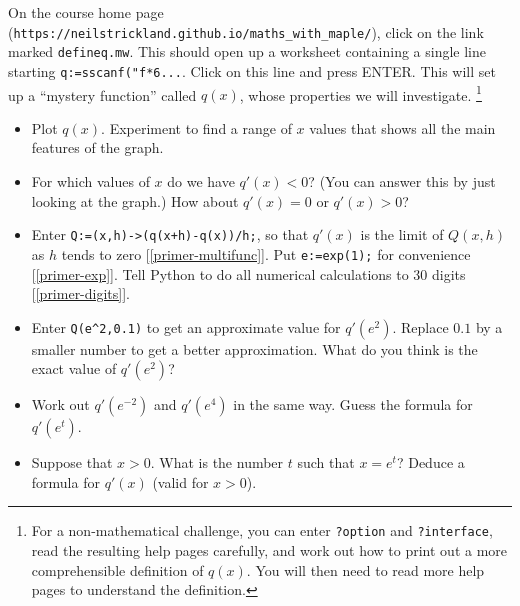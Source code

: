 \documentclass[a4paper,10pt]{amsbook}
\begin{document}
\begin{exercise}\label{ex-Li}
 On the course home page
 (\verb~https://neilstrickland.github.io/maths_with_maple/~), click on
 the link marked \verb~defineq.mw~.  This should open up a worksheet 
 containing a single line starting
 \verb~q:=sscanf("f*6...~.  Click on this line and press
 ENTER.  This will set up a ``mystery function'' called
 $q(x)$, whose properties we will investigate. 
 \footnote{For a non-mathematical challenge, you can enter
  \verb~?option~ and \verb~?interface~, read the resulting help pages
  carefully, and work out how to print out a more
  comprehensible definition of $q(x)$.  You will then need
  to read more help pages to understand the definition. 
 }
 \begin{itemize}
  \item[(a)] Plot $q(x)$.  Experiment to find a range of $x$ values
   that shows all the main features of the graph. 
  \item[(b)] For which values of $x$ do we have $q'(x)<0$?  (You can
   answer this by just looking at the graph.)  How about $q'(x)=0$ or
   $q'(x)>0$? 
  \item[(c)] Enter \verb~Q:=(x,h)->(q(x+h)-q(x))/h;~, so that $q'(x)$
   is the limit of $Q(x,h)$ as $h$ tends to zero
   [\ref{primer-multifunc}].  Put \verb~e:=exp(1);~ for
   convenience [\ref{primer-exp}].  Tell Python to do all numerical
   calculations to 30 digits [\ref{primer-digits}]. 
  \item[(d)] Enter \verb~Q(e^2,0.1)~ to get an approximate value for
   $q'(e^2)$.  Replace $0.1$ by a smaller number to get a better
   approximation.  What do you think is the exact value of $q'(e^2)$? 
  \item[(e)] Work out $q'(e^{-2})$ and $q'(e^4)$ in the same way. 
   Guess the formula for $q'(e^t)$. 
  \item[(f)] Suppose that $x>0$.  What is the number $t$
   such that $x=e^t$?  Deduce a formula for $q'(x)$ (valid for $x>0$). 
 \end{itemize}
\end{exercise}
\end{document}
